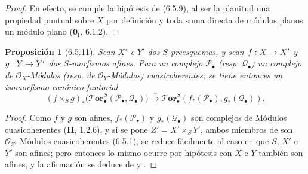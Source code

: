 \documentclass[10pt,oneside,openany]{book}
\theoremstyle{egaenv}\newtheorem*{env}{---}
\theoremstyle{egastatement}
\newtheorem*{proposition}{Proposición}
\theoremstyle{egadescription}
\renewcommand{\to}{\mathchoice{\longrightarrow}{\rightarrow}{\rightarrow}{\rightarrow}}
\begin{document}
\begin{proof}
En efecto, se cumple la hipótesis de (6.5.9), al ser la planitud una propiedad
puntual sobre $X$ por definición y toda suma directa de módulos planos
un módulo plano ($\mathbf{0}_{\mathrm I}$, 6.1.2).
\end{proof}

\begin{proposition}[6.5.11]
\label{III.6.5.11}
Sean $X'$ e $Y'$ dos $S$-preesquemas, y sean
$f:X\to X'$ y $g:Y\to Y'$ dos $S$-morfismos afines. Para un
complejo $\mathscr P_\bullet$ \textup{(resp.}
$\mathscr Q_\bullet$\textup{)} un complejo de $\mathscr O_X$-Módulos \textup{(resp.} de
$\mathscr O_Y$-Módulos\textup{)} cuasicoherentes; se tiene entonces un isomorfismo canónico funtorial
\[
  (f\times_S g)_*
  \bigl(\boldsymbol{\mathscr{T}\!or}_\bullet^S
    (\mathscr P_\bullet,\mathscr Q_\bullet)\bigr)
  \xrightarrow{\sim}
  \boldsymbol{\mathscr{T}\!or}_\bullet^S
  (f_*(\mathscr P_\bullet),g_*(\mathscr Q_\bullet)).
  \tag{6.5.11.1}\label{III.6.5.11.1.fr}
\]
\end{proposition}

\begin{proof}
Como $f$ y $g$ son afines, $f_*(\mathscr P_\bullet)$ y
$g_*(\mathscr Q_\bullet)$ son complejos de Módulos cuasicoherentes (\textbf{II}, 1.2.6), y si se pone $Z'=X'\times_S Y'$, ambos miembros de
 son $\mathscr O_{Z'}$-Módulos cuasicoherentes (6.5.1); se reduce fácilmente al caso en que $S$, $X'$ e $Y'$ son afines; pero entonces lo mismo ocurre por hipótesis con $X$ e $Y$ también son
afines, y la afirmación se deduce de  y
.
\end{proof}
\end{document}
